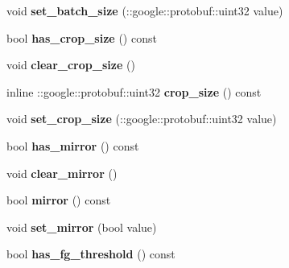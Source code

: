 \begin{DoxyCompactItemize}
void {\bfseries set\+\_\+batch\+\_\+size} (\+::google\+::protobuf\+::uint32 value)
\item 
\mbox{\label{classcaffe_1_1_window_data_parameter_a5af622e6c08840a6e4f989455748d5fa}} 
bool {\bfseries has\+\_\+crop\+\_\+size} () const
\item 
\mbox{\label{classcaffe_1_1_window_data_parameter_aca3ef2729ef5c24ab5f3b2c5c1dd9e5b}} 
void {\bfseries clear\+\_\+crop\+\_\+size} ()
\item 
\mbox{\label{classcaffe_1_1_window_data_parameter_abe6bc9c99968645bdbd465f32123b6c2}} 
inline \+::google\+::protobuf\+::uint32 {\bfseries crop\+\_\+size} () const
\item 
\mbox{\label{classcaffe_1_1_window_data_parameter_a256cac6b35436291c1ccc8a9fa3510e3}} 
void {\bfseries set\+\_\+crop\+\_\+size} (\+::google\+::protobuf\+::uint32 value)
\item 
\mbox{\label{classcaffe_1_1_window_data_parameter_a11b450dd0d5b3017607784a0387d2aff}} 
bool {\bfseries has\+\_\+mirror} () const
\item 
\mbox{\label{classcaffe_1_1_window_data_parameter_a9f3010b7988d471f2ee11248610f0f22}} 
void {\bfseries clear\+\_\+mirror} ()
\item 
\mbox{\label{classcaffe_1_1_window_data_parameter_a74f273c95c4f53b9876e4630786e7327}} 
bool {\bfseries mirror} () const
\item 
\mbox{\label{classcaffe_1_1_window_data_parameter_a63e949fc8640cb0cd020956cd1826235}} 
void {\bfseries set\+\_\+mirror} (bool value)
\item 
\mbox{\label{classcaffe_1_1_window_data_parameter_ad4c18c914017b3a212f89df81ac1b371}} 
bool {\bfseries has\+\_\+fg\+\_\+threshold} () const
\item 
\mbox{\label{classcaffe_1_1_window_data_parameter_aa29df17d544b07438c37d74b333167b1}} 

\end{DoxyCompactItemize}
